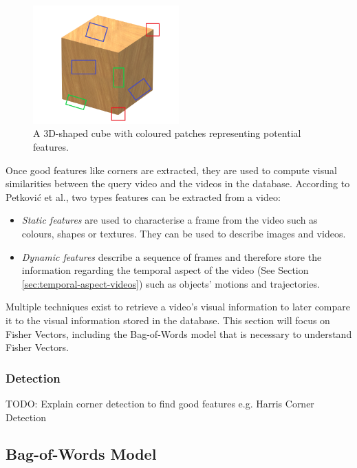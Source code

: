 \documentclass[11pt,openany,a4paper]{article}
\begin{document}
\begin{figure}[h]
\centerline{\includegraphics[width=0.5\textwidth]{figures/features_cube.png}}
\caption{\label{fig:features_cube}A 3D-shaped cube with coloured patches representing potential features.}
\end{figure}

Once good features like corners are extracted, they are used to compute visual similarities between the query video and the videos in the database. According to Petković et al., two types features can be extracted from a video: 
\begin{itemize}
    \item \textit{Static features} are used to characterise a frame from the video such as colours, shapes or textures. They can be used to describe images and videos.
    \item \textit{Dynamic features} describe a sequence of frames and therefore store the information regarding the temporal aspect of the video (See Section \ref{sec:temporal-aspect-videos}) such as objects' motions and trajectories.
\end{itemize}

Multiple techniques exist to retrieve a video's visual information to later compare it to the visual information stored in the database. This section will focus on Fisher Vectors, including the Bag-of-Words model that is necessary to understand Fisher Vectors.

\subsubsection{Detection}
\label{sec:corner-detection}

TODO: Explain corner detection to find good features e.g. Harris Corner Detection


\subsection{Bag-of-Words Model}
\label{sec:BoW}
\end{document}
